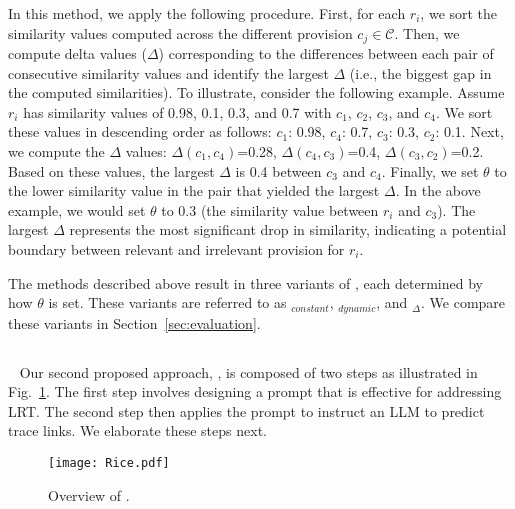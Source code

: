In this method, we apply the following procedure. First, for each $r_i$, we sort the similarity values computed across the different provision $c_j\in\mathcal{C}$. Then, we compute delta values ($\Delta$) corresponding to the differences between each pair of consecutive similarity values and identify the largest $\Delta$ (i.e., the biggest gap in the computed similarities). 
%
To illustrate, consider the following example. Assume $r_i$ has similarity values of 0.98, 0.1, 0.3, and 0.7 with $c_1$, $c_2$, $c_3$, and $c_4$. We sort these values in descending order as follows: $c_1$: 0.98, $c_4$: 0.7, $c_3$: 0.3, $c_2$: 0.1. Next, we compute the $\Delta$ values: $\Delta(c_1, c_4)$=0.28, $\Delta(c_4, c_3)$=0.4, $\Delta(c_3, c_2)$=0.2. Based on these values, the largest $\Delta$ is 0.4 between $c_3$ and $c_4$. 
Finally, we set $\theta$ to the lower similarity value in the pair that yielded the largest $\Delta$. In the above example, we would set $\theta$ to 0.3 (the similarity value between $r_i$  and $c_3$).  
The largest $\Delta$ represents the most significant drop in similarity, indicating a potential boundary between relevant and irrelevant provision for $r_i$.     

The  methods described above result in three variants of \kashif, each determined by how $\theta$ is set. These variants are referred to as \kashif$_{constant}$, \kashif$_{dynamic}$, and \kashif$_\Delta$. We compare these variants in  Section~\ref{sec:evaluation}. 

\subsection{\RICE}~\label{subsec:Prompting_LLMs}
Our second proposed approach, \RICE, is composed of two steps as illustrated in Fig.~\ref{fig:rice}. The first step involves designing a prompt that is effective for addressing LRT. The second step then applies the prompt to instruct an LLM to predict trace links. We elaborate these steps next. 
\begin{figure}[H]
\texttt{[image: Rice.pdf]}
  \caption{Overview of \RICE.}
  \label{fig:rice}
\end{figure}

